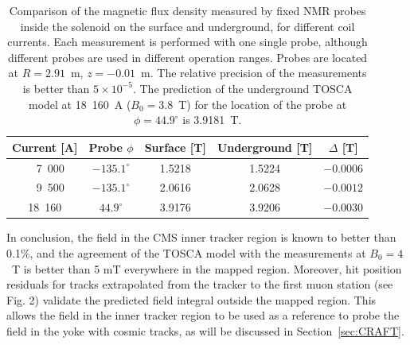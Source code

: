 \begin{table}
\caption{Comparison of the magnetic flux density measured by fixed NMR
  probes inside the solenoid on the surface and underground, for
  different coil currents. 
  Each measurement is performed with one single probe, although
  different probes are used in different operation ranges. 
  Probes are located at $R=2.91$~m, $z = -0.01$~m.
  The relative precision of the measurements is better than
  $5\times10^{-5}$.
  The prediction of the underground TOSCA model at 18\ 160~A
  ($B_0=3.8$~T) for the location of the probe at $\phi=44.9^{\circ}$ is 3.9181~T.
}
\label{tab:NMR}

\begin{center}
\begin{tabular}{c|c|cc|c}
\hline
Current [A] & Probe $\phi$ & Surface [T] & Underground [T] & $\Delta$ [T] \\
\hline
\ \ 7\ 000 & $-135.1^{\circ}$ & 1.5218 & 1.5224 & $-0.0006$ \\
\ \ 9\ 500 & $-135.1^{\circ}$ & 2.0616 & 2.0628 & $-0.0012$ \\
18\ 160 & $44.9^{\circ}$  & 3.9176 & 3.9206 & $-0.0030$ \\
\hline
\end{tabular}

\end{center}
\end{table}


In conclusion, the field in the CMS inner tracker region is known to
better than 0.1\%, and the agreement of the TOSCA model with the
measurements at $B_0=4$~T is better than 5 mT everywhere in the
mapped region.
Moreover, hit position residuals for tracks extrapolated from the tracker
to the first muon station (see Fig. 2) validate
the predicted field integral outside the mapped region.
This allows the field in the inner tracker region to be used as a
reference to probe the field in the yoke with cosmic tracks, as will
be discussed in Section~\ref{sec:CRAFT}.

